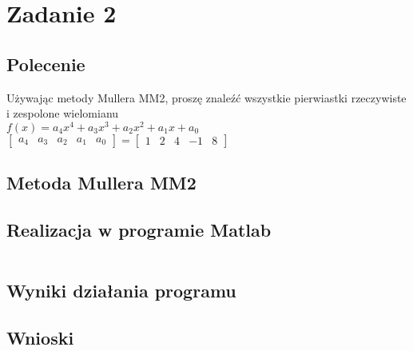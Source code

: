 \documentclass[a4paper, 11pt]{article}
\begin{document}
\section{Zadanie 2}

\subsection{Polecenie}
Używając metody Mullera MM2, proszę znaleźć wszystkie pierwiastki rzeczywiste i zespolone wielomianu \\
$f(x) = a_{4}x^4+a_{3}x^3+a_{2}x^2+a_{1}x+a_{0}$ 
$
\left[
\begin{array}{ccccc}
       a_{4} & a_{3} & a_{2} & a_{1} & a_{0}
\end{array}
\right]
=
\left[
\begin{array}{ccccc}
       1 & 2 & 4 & -1 & 8
\end{array}
\right]$


\subsection{Metoda Mullera MM2}


\subsection{Realizacja w programie Matlab}
\begin{lstlisting}

\end{lstlisting}

\vspace{2cm}

\subsection{Wyniki działania programu}

\vspace{10cm}
\subsection{Wnioski}

	
\end{document}
